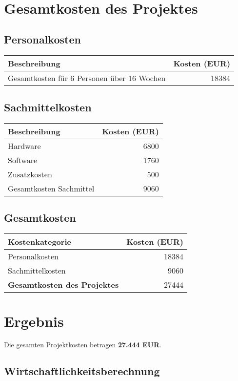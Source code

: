 \section*{Gesamtkosten des Projektes}

\subsection*{Personalkosten}
\begin{tabular}{lr}
  \toprule
  \textbf{Beschreibung} & \textbf{Kosten (EUR)} \\
  \midrule
  Gesamtkosten für 6 Personen über 16 Wochen & 18384 \\
  \bottomrule
\end{tabular}

\subsection*{Sachmittelkosten}
\begin{tabular}{lr}
  \toprule
  \textbf{Beschreibung} & \textbf{Kosten (EUR)} \\
  \midrule
  Hardware & 6800 \\
  Software & 1760 \\
  Zusatzkosten & 500 \\
  \midrule
  Gesamtkosten Sachmittel & 9060 \\
  \bottomrule
\end{tabular}

\subsection*{Gesamtkosten}
\begin{tabular}{lr}
  \toprule
  \textbf{Kostenkategorie} & \textbf{Kosten (EUR)} \\
  \midrule
  Personalkosten & 18384 \\
  Sachmittelkosten & 9060 \\
  \midrule
  \textbf{Gesamtkosten des Projektes} & 27444 \\
  \bottomrule
\end{tabular}

\section*{Ergebnis}
Die gesamten Projektkosten betragen \textbf{27.444 EUR}.


\subsection{Wirtschaftlichkeitsberechnung}\label{wirtschaftlichkeitsberechnung}

